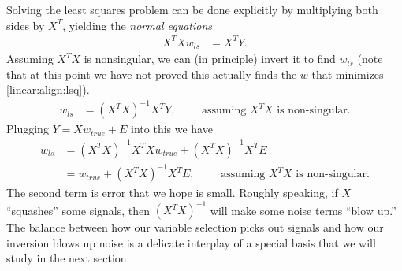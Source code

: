 Solving the least squares problem can be done explicitly by multiplying both sides by $X^T$, yielding the \emph{normal equations}
\begin{align*}
  X^TXw_{ls} &= X^TY. 
\end{align*}
Assuming $X^TX$ is nonsingular, we can (in principle) invert it to find $w_{ls}$ (note that at this point we have not proved this actually finds the $w$ that minimizes \eqref{linear:align:lsq}).
\begin{align*}
  w_{ls} &= (X^TX)^{-1}X^TY,\qquad \mbox{ assuming $X^TX$ is non-singular}.
\end{align*}
Plugging $Y = Xw_{true} + E$ into this we have
\begin{align*}
  w_{ls} &= (X^TX)^{-1}X^TXw_{true} + (X^TX)^{-1}X^TE\\
  &= w_{true} + (X^TX)^{-1}X^TE ,\qquad \mbox{ assuming $X^TX$ is non-singular}.
\end{align*}
The second term is error that we hope is small.  Roughly speaking, if $X$ ``squashes'' some signals, then $(X^TX)^{-1}$ will make some noise terms ``blow up.''  The balance between how our variable selection picks out signals and how our inversion blows up noise is a delicate interplay of a special basis that we will study in the next section.


